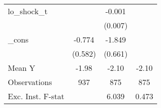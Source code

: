 {\begin{tabular}{l*{3}{c}}
\addlinespace
lo\_shock\_t  &                     &      -0.001         &                     \\
            &                     &     (0.007)         &                     \\
\addlinespace
\_cons      &      -0.774         &      -1.849\sym{***}&                     \\
            &     (0.582)         &     (0.661)         &                     \\
\midrule
Mean Y      &       -1.98         &       -2.10         &       -2.10         \\
Observations&         937         &         875         &         875         \\
Exc. Inst. F-stat&                     &       6.039         &       0.473         \\
\bottomrule
\end{tabular}
}
